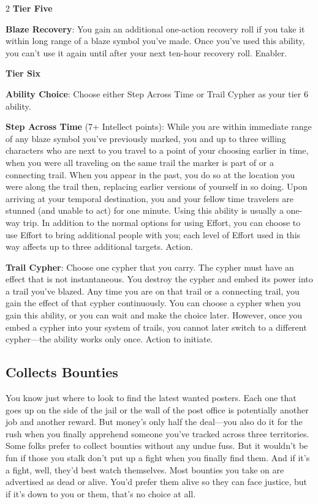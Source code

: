 \begin{multicols}{2}
\textbf{Tier Five}

\textbf{Blaze Recovery}: You gain an additional one-action recovery roll if you take it within long range of a blaze symbol you’ve made. Once you’ve used this ability, you can’t use it again until after your next ten-hour recovery roll. Enabler. 

\textbf{Tier Six}

\textbf{Ability Choice}: Choose either Step Across Time or Trail Cypher as your tier 6 ability. 

\textbf{Step Across Time} (7+ Intellect points): While you are within immediate range of any blaze symbol you’ve previously marked, you and up to three willing characters who are next to you travel to a point of your choosing earlier in time, when you were all traveling on the same trail the marker is part of or a connecting trail. When you appear in the past, you do so at the location you were along the trail then, replacing earlier versions of yourself in so doing. Upon arriving at your temporal destination, you and your fellow time travelers are stunned (and unable to act) for one minute. Using this ability is usually a one-way trip. In addition to the normal options for using Effort, you can choose to use Effort to bring additional people with you; each level of Effort used in this way affects up to three additional targets. Action. 

\textbf{Trail Cypher}: Choose one cypher that you carry. The cypher must have an effect that is not instantaneous. You destroy the cypher and embed its power into a trail you’ve blazed. Any time you are on that trail or a connecting trail, you gain the effect of that cypher continuously. You can choose a cypher when you gain this ability, or you can wait and make the choice later. However, once you embed a cypher into your system of trails, you cannot later switch to a different cypher—the ability works only once. Action to initiate. 

\subsection{Collects Bounties}
 
You know just where to look to find the latest wanted posters. Each one that goes up on the side of the jail or the wall of the post office is potentially another job and another reward. But money’s only half the deal—you also do it for the rush when you finally apprehend someone you’ve tracked across three territories. Some folks prefer to collect bounties without any undue fuss. But it wouldn’t be fun if those you stalk don’t put up a fight when you finally find them. And if it’s a fight, well, they’d best watch themselves. Most bounties you take on are advertised as dead or alive. You’d prefer them alive so they can face justice, but if it’s down to you or them, that’s no choice at all.


\end{multicols}
